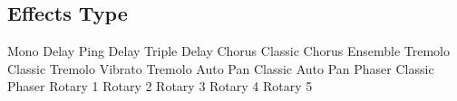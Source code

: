 \subsection{Effects Type}









































Mono Delay
Ping Delay
Triple Delay
Chorus
Classic Chorus
Ensemble
Tremolo
Classic Tremolo
Vibrato Tremolo
Auto Pan
Classic Auto Pan
Phaser
Classic Phaser
Rotary 1
Rotary 2
Rotary 3
Rotary 4
Rotary 5
